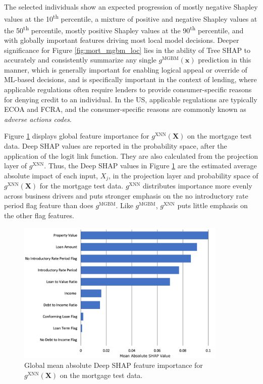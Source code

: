 \documentclass[information,article,submit,moreauthors,pdftex]{definitions/mdpi}
\begin{document}
\noindent The selected individuals show an expected progression of mostly negative Shapley values at the 10\textsuperscript{th} percentile, a mixture of positive and negative Shapley values at the 50\textsuperscript{th} percentile, mostly positive Shapley values at the 90\textsuperscript{th} percentile, and with globally important features driving most local model decisions. Deeper significance for Figure \ref{fig:mort_mgbm_loc} lies in the ability of Tree SHAP to accurately and consistently summarize any single $g^\text{MGBM}(\mathbf{x})$ prediction in this manner, which is generally important for enabling logical appeal or override of ML-based decisions, and is specifically important in the context of lending, where applicable regulations often require lenders to provide consumer-specific reasons for denying credit to an individual. In the US, applicable regulations are typically ECOA and FCRA, and the consumer-specific reasons are commonly known as \textit{adverse actions codes}.

Figure \ref{fig:mort_xnn_glob} displays global feature importance for $g^\text{XNN}(\mathbf{X})$ on the mortgage test data. Deep SHAP values are reported in the probability space, after the application of the logit link function. They are also calculated from the projection layer of $g^\text{XNN}$. Thus, the Deep SHAP values in Figure \ref{fig:mort_xnn_glob} are the estimated average absolute impact of each input, $X_j$, in the projection layer and probability space of $g^\text{XNN}(\mathbf{X})$ for the mortgage test data. $g^\text{XNN}$ distributes importance more evenly across business drivers and puts stronger emphasis on the no introductory rate period flag feature than does $g^\text{MGBM}$. Like $g^\text{MGBM}$, $g^\text{XNN}$ puts little emphasis on the other flag features.  

\begin{figure}[htb]
\centering
\includegraphics[width=10cm]{img/mort_xnn_glob.png}
\caption{Global mean absolute Deep SHAP feature importance for $g^\text{XNN}(\mathbf{X})$ on the mortgage test data.}
\label{fig:mort_xnn_glob}
\end{figure} 
\end{document}

